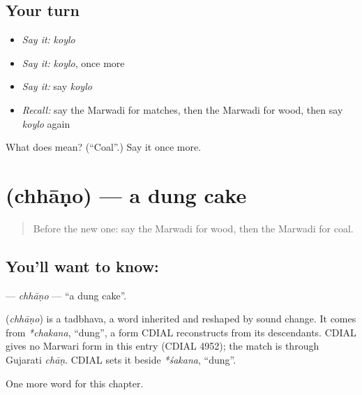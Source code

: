 \subsection*{Your turn}
\begin{itemize}
\raggedright
  \item \emph{Say it:} \emph{koylo}
  \item \emph{Say it:} \emph{koylo}, once more
  \item \emph{Say it:} say \emph{koylo}
  \item \emph{Recall:} say the Marwadi for matches, then the Marwadi for wood, then say \emph{koylo} again
\end{itemize}

\begin{tcolorbox}[breakable,colback=teal!4,colframe=teal!35!black,title={Before you move on}]
What does  mean? (\textquotedblleft{}Coal\textquotedblright{}.) Say it once more.
\end{tcolorbox}
\section[\texorpdfstring{\mw{छाणो} (chhāṇo)}{छाणो (chhāṇo)}]{ (chhāṇo) — a dung cake}

\label{lesson:MW-C126-chhano}



\begin{quote}
Before the new one: say the Marwadi for wood, then the Marwadi for coal.
\end{quote}

\subsection*{You'll want to know: }
\textbf{} — \emph{chhāṇo} — \textquotedblleft{}a dung cake\textquotedblright{}.

\begin{cousinweb}
\textbf{} (\emph{chhāṇo}) is a tadbhava, a word inherited and reshaped by sound change. It comes from \emph{*chakana}, \textquotedblleft{}dung\textquotedblright{}, a form CDIAL reconstructs from its descendants. CDIAL gives no Marwari form in this entry (CDIAL 4952); the match is through Gujarati \emph{chāṇ}. CDIAL sets it beside \emph{*śakana}, \textquotedblleft{}dung\textquotedblright{}.
\end{cousinweb}

\begin{grammarlens}[title={What you've built}]
One more word for this chapter.
\end{grammarlens}

